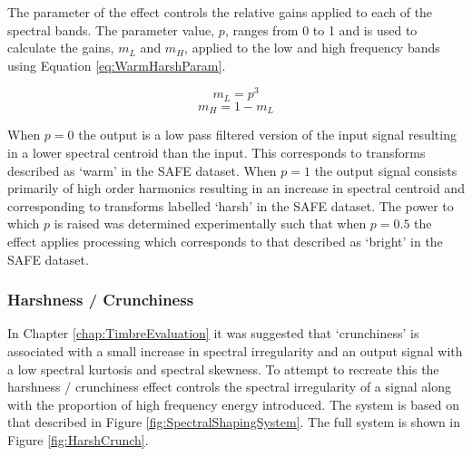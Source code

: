 			The parameter of the effect controls the relative gains applied to each of the spectral bands. The
			parameter value, $p$, ranges from 0 to 1 and is used to calculate the gains, $m_{L}$ and $m_{H}$,
			applied to the low and high frequency bands using Equation \ref{eq:WarmHarshParam}.

			\[ m_{L} = p^{3} \]
			\begin{equation}
				m_{H} = 1 - m_{L}
				\label{eq:WarmHarshParam}
			\end{equation}

			When $p = 0$  the output is a low pass filtered version of the input signal resulting in a lower
			spectral centroid than the input. This corresponds to transforms  described as `warm' in the SAFE
			dataset. When $p = 1$ the output signal consists primarily of high order harmonics resulting in an
			increase in spectral centroid and corresponding to transforms labelled `harsh' in the SAFE dataset.
			The power to which $p$ is raised was determined experimentally such that when $p = 0.5$ the effect
			applies processing which corresponds to that described as `bright' in the SAFE dataset. 

		\subsubsection*{Harshness / Crunchiness}
			In Chapter \ref{chap:TimbreEvaluation} it was suggested that `crunchiness' is associated with a
			small increase in spectral irregularity and an output signal with a low spectral kurtosis and
			spectral skewness. To attempt to recreate this the harshness / crunchiness effect controls the
			spectral irregularity of a signal along with the proportion of high frequency energy introduced.
			The system is based on that described in Figure \ref{fig:SpectralShapingSystem}. The full system is
			shown in Figure \ref{fig:HarshCrunch}.


